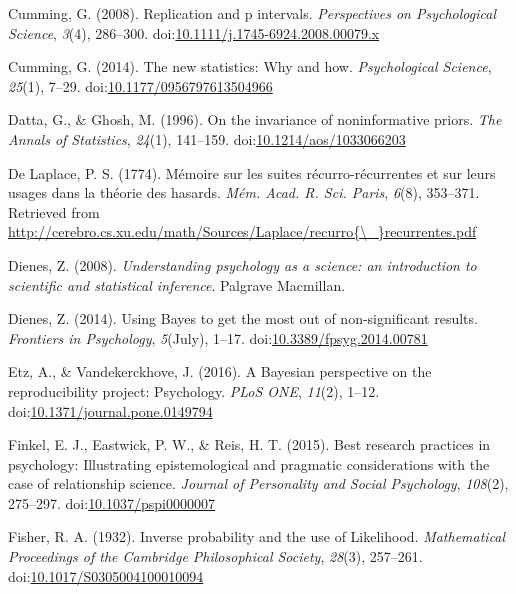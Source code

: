 \documentclass[,man, mask]{apa6}
\theoremstyle{definition}
\theoremstyle{definition}
\theoremstyle{definition}
\theoremstyle{remark}
\begin{document}
\hypertarget{ref-Cumming2008}{}
Cumming, G. (2008). Replication and p intervals. \emph{Perspectives on
Psychological Science}, \emph{3}(4), 286--300.
doi:\href{https://doi.org/10.1111/j.1745-6924.2008.00079.x}{10.1111/j.1745-6924.2008.00079.x}

\hypertarget{ref-Cumming2014}{}
Cumming, G. (2014). The new statistics: Why and how. \emph{Psychological
Science}, \emph{25}(1), 7--29.
doi:\href{https://doi.org/10.1177/0956797613504966}{10.1177/0956797613504966}

\hypertarget{ref-Datta1996}{}
Datta, G., \& Ghosh, M. (1996). On the invariance of noninformative
priors. \emph{The Annals of Statistics}, \emph{24}(1), 141--159.
doi:\href{https://doi.org/10.1214/aos/1033066203}{10.1214/aos/1033066203}

\hypertarget{ref-DeLaplace1774}{}
De Laplace, P. S. (1774). Mémoire sur les suites récurro-récurrentes et
sur leurs usages dans la théorie des hasards. \emph{Mém. Acad. R. Sci.
Paris}, \emph{6}(8), 353--371. Retrieved from
\href{http://cerebro.cs.xu.edu/math/Sources/Laplace/recurro\%7B/_\%7Drecurrentes.pdf}{http://cerebro.cs.xu.edu/math/Sources/Laplace/recurro\{\textbackslash{}\_\}recurrentes.pdf}

\hypertarget{ref-Dienes2008}{}
Dienes, Z. (2008). \emph{Understanding psychology as a science: an
introduction to scientific and statistical inference}. Palgrave
Macmillan.

\hypertarget{ref-Dienes2014}{}
Dienes, Z. (2014). Using Bayes to get the most out of non-significant
results. \emph{Frontiers in Psychology}, \emph{5}(July), 1--17.
doi:\href{https://doi.org/10.3389/fpsyg.2014.00781}{10.3389/fpsyg.2014.00781}

\hypertarget{ref-Etz2016}{}
Etz, A., \& Vandekerckhove, J. (2016). A Bayesian perspective on the
reproducibility project: Psychology. \emph{PLoS ONE}, \emph{11}(2),
1--12.
doi:\href{https://doi.org/10.1371/journal.pone.0149794}{10.1371/journal.pone.0149794}

\hypertarget{ref-Finkel2015}{}
Finkel, E. J., Eastwick, P. W., \& Reis, H. T. (2015). Best research
practices in psychology: Illustrating epistemological and pragmatic
considerations with the case of relationship science. \emph{Journal of
Personality and Social Psychology}, \emph{108}(2), 275--297.
doi:\href{https://doi.org/10.1037/pspi0000007}{10.1037/pspi0000007}

\hypertarget{ref-Fisher1932}{}
Fisher, R. A. (1932). Inverse probability and the use of Likelihood.
\emph{Mathematical Proceedings of the Cambridge Philosophical Society},
\emph{28}(3), 257--261.
doi:\href{https://doi.org/10.1017/S0305004100010094}{10.1017/S0305004100010094}
\end{document}
